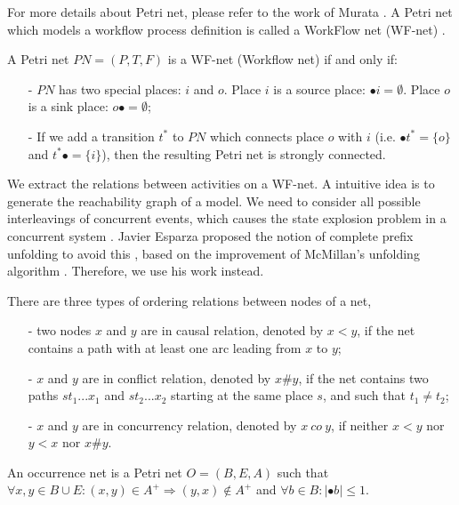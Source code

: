 \documentclass{llncs}
\begin{document}
For more details about Petri net, please refer to the work of Murata \cite{murata1989petri}. A Petri net which models a workflow process definition is called a WorkFlow net (WF-net) \cite{van1998application}.

\begin{definition}[WF-net]\label{def:wfnet}
A Petri net $PN=(P,T,F)$ is a WF-net (Workflow net) if and only if:
	\begin{itemize}
		\item[-] $PN$ has two special places: $i$ and $o$. Place $i$ is a source place: $\bullet i=\emptyset$. Place $o$ is a sink place: $o\bullet =\emptyset$;
		\item[-] If we add a transition $t^{*}$ to $PN$ which connects place $o$ with $i$ (i.e. $\bullet t^{*}=\{o\}$ and $t^{*}\bullet=\{i\}$), then the resulting Petri net is strongly connected.
	\end{itemize}
\end{definition}

We extract the relations between activities on a WF-net. A intuitive idea is to generate the reachability graph of a model. We need to consider all possible interleavings of concurrent events, which causes the state explosion problem in a concurrent system \cite{mcmillan1995technique}. Javier Esparza proposed the notion of complete prefix unfolding to avoid this \cite{esparza1996improvement}, based on the improvement of McMillan's unfolding algorithm \cite{mcmillan1995technique}. Therefore, we use his work instead.

\begin{definition}\label{def:orderingRelations}
There are three types of ordering relations between nodes of a net,
	\begin{itemize}
		\item[-] two nodes $x$ and $y$ are in causal relation, denoted by $x<y$, if the net contains a path with at least one arc leading from $x$ to $y$;
		\item[-] $x$ and $y$ are in conflict relation, denoted by $x\#y$, if the net contains two paths $st_{1}...x_{1}$ and $st_{2}...x_{2}$ starting at the same place $s$, and such that $t_{1}\neq t_{2}$;
		\item[-] $x$ and $y$ are in concurrency relation, denoted by $x~co~y$, if neither $x<y$ nor $y<x$ nor $x\#y$.
	\end{itemize}
\end{definition}

\begin{definition}\label{def:occurrenceNet}
An occurrence net is a Petri net $O=(B,E,A)$ such that $\forall x,y\in B\cup E:(x,y)
\in A^{+}\Rightarrow(y,x)\notin A^{+}$ and $\forall b\in B:|\bullet b|\leq 1$.
\end{definition}
\end{document}
